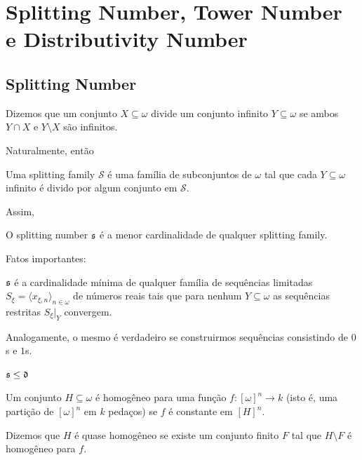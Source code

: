\chapter[Splitting, Tower and Distributivity]{Splitting Number, Tower Number e Distributivity Number}

\section{Splitting Number}

\begin{definition}
    Dizemos que um conjunto $X\subseteq \omega$ divide um conjunto infinito $Y\subseteq \omega$ se ambos $Y\cap X$ e $Y\setminus X$ são infinitos.
\end{definition}

Naturalmente, então

\begin{definition}
    Uma splitting family $\mathcal S$ é uma família de subconjuntos de $\omega$ tal que cada $Y\subseteq \omega$ infinito é divido por algum conjunto em $\mathcal S$.  
\end{definition}

Assim,

\begin{definition}
    O splitting number $\mathfrak{s}$ é a menor cardinalidade de qualquer splitting family.
\end{definition}

Fatos importantes:

\begin{theorem}
    $\mathfrak{s}$ é a cardinalidade mínima de qualquer família de sequências limitadas $S_\xi = \langle x_{\xi,n}\rangle_{n\in\omega}$ de números reais tais que para nenhum $Y\subseteq \omega$ as sequências restritas $S_\xi|_Y$ convergem. 
    
    Analogamente, o mesmo é verdadeiro se construirmos sequências consistindo de $0$s e $1$s.
\end{theorem}

\begin{theorem}
    $\mathfrak{s} \leq \mathfrak{d}$
\end{theorem}

\begin{definition}
    Um conjunto $H\subseteq \omega$ é homogêneo para uma função $f: [\omega]^n \to k$ (isto é, uma partição de $[\omega]^n$ em $k$ pedaços) se $f$ é constante em $[H]^n$.

    Dizemos que $H$ é quase homogêneo se existe um conjunto finito $F$ tal que $H\setminus F$ é homogêneo para $f$.
\end{definition}

